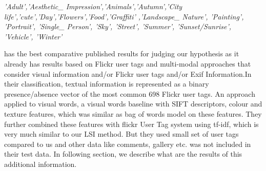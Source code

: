 \textit{'Adult','Aesthetic\_ Impression','Animals','Autumn','City life','cute','Day','Flowers','Food','Graffiti' ,'Landscape\_ Nature', 'Painting', 'Portrait', 'Single\_ Person', 'Sky', 'Street', 'Summer', 'Sunset/Sunrise', 'Vehicle', 'Winter'} 

 \citet*{CLEF} has the best comparative published results for judging our hypothesis as it already has 
results based on Flickr user tags and multi-modal approaches that consider visual information and/or Flickr user tags and/or Exif 
Information.In their classification, textual information is represented as a binary presence/absence vector of the most common 698 Flickr user tags. An approach applied to visual words, a visual words baseline with SIFT descriptors, colour and texture
features, which was similar as bag of words model on these features. They further combined these features with flickr User Tag system using tf-idf, which is very much similar to our LSI method. But they used small set of user tags compared to us and other data like comments, gallery etc. was not included in their test data. In following section, we describe what are the results of this additional information.

